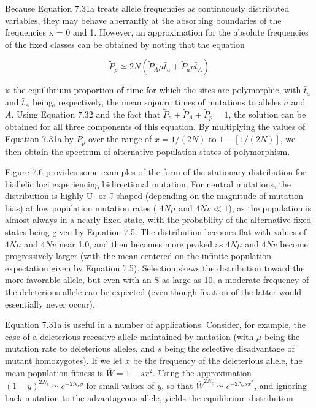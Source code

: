 \documentclass{article}
\begin{document}
Because Equation 7.31a treats allele frequencies as continuously distributed variables, they may behave aberrantly at the absorbing boundaries of the frequencies x = 0 and 1. However, an approximation for the absolute frequencies of the fixed classes can be obtained by noting that the equation

\begin{equation}
\widetilde{P}_{p}\simeq2N(\widetilde{P}_{A}\mu\bar{t}_{a}+\widetilde{P}_{a}v\bar{t}_{A})
\tag{7.33}
\label{eq:7_33}
\end{equation}

is the equilibrium proportion of time for which the sites are polymorphic, with  $ \bar{t}_a $ and  $ \bar{t}_A $ being, respectively, the mean sojourn times of mutations to alleles  $ a $ and  $ A $. Using Equation 7.32 and the fact that  $ \widetilde{P}_a + \widetilde{P}_A + \widetilde{P}_p = 1 $, the solution can be obtained for all three components of this equation. By multiplying the values of Equation 7.31a by  $ \widetilde{P}_p $ over the range of  $ x = 1/(2N) $ to  $ 1 - [1/(2N)] $, we then obtain the spectrum of alternative population states of polymorphism.

Figure 7.6 provides some examples of the form of the stationary distribution for biallelic loci experiencing bidirectional mutation. For neutral mutations, the distribution is highly U- or J-shaped (depending on the magnitude of mutation bias) at low population mutation rates ( $ 4N\mu $ and  $ 4Nv \ll 1 $), as the population is almost always in a nearly fixed state, with the probability of the alternative fixed states being given by Equation 7.5. The distribution becomes flat with values of  $ 4N\mu $ and  $ 4Nv $ near 1.0, and then becomes more peaked as  $ 4N\mu $ and  $ 4Nv $ become progressively larger (with the mean centered on the infinite-population expectation given by Equation 7.5). Selection skews the distribution toward the more favorable allele, but even with an S as large as 10, a moderate frequency of the deleterious allele can be expected (even though fixation of the latter would essentially never occur).

Equation 7.31a is useful in a number of applications. Consider, for example, the case of a deleterious recessive allele maintained by mutation (with  $ \mu $ being the mutation rate to deleterious alleles, and  $ s $ being the selective disadvantage of mutant homozygotes). If we let  $ x $ be the frequency of the deleterious allele, the mean population fitness is  $ \overline{W} = 1 - s x^2 $. Using the approximation  $ (1 - y)^{2N_e} \simeq e^{-2N_e y} $ for small values of  $ y $, so that  $ \overline{W}^{2N_e} \simeq e^{-2N_e s x^2} $, and ignoring back mutation to the advantageous allele, yields the equilibrium distribution
\end{document}
